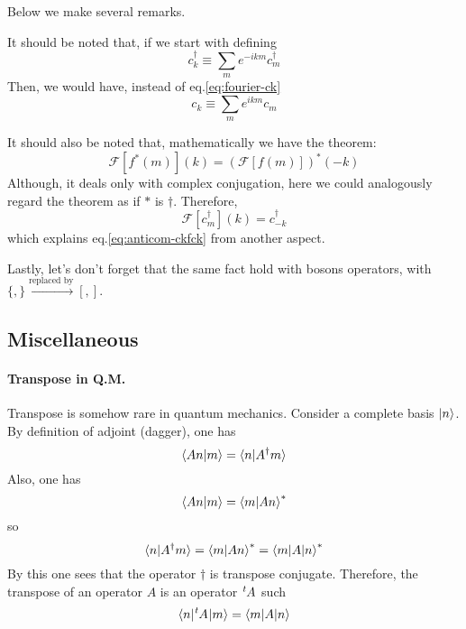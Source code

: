 Below we make several remarks.
\begin{remark}
    It should be noted that, if we start with defining
    \begin{equation}
        c^\dagger_k \equiv \sum_m e^{-ikm} c^\dagger_m
    \end{equation}
    Then, we would have, instead of eq.\ref{eq:fourier-ck}
    \begin{equation}
        c_k \equiv \sum_m e^{ikm} c_m
    \end{equation}
\end{remark}

\begin{remark}
    It should also be noted that, mathematically we have the theorem:
    \begin{equation}
        \mathcal{F}[f^*(m)](k) = (\mathcal{F}[f(m)])^*(-k)
    \end{equation}
    Although, it deals only with complex conjugation, here we could analogously
    regard the theorem as if $*$ is $\dagger$. Therefore,
    \begin{equation}
        \mathcal{F}[c^\dagger_m](k) = c^\dagger_{-k}
    \end{equation}
    which explains eq.\ref{eq:anticom-ckfck} from another aspect.
\end{remark}

\begin{remark}
    Lastly, let's don't forget that the same fact hold with bosons operators, with
    $\{,\}\overset{\text{replaced by}}{\to}[,]$.
\end{remark}

\subsection{Miscellaneous}
\label{sec:Miscellaneous}

\paragraph{Transpose in Q.M.}

Transpose is somehow rare in quantum mechanics. Consider a complete
basis $\ket{n}$. By definition of adjoint (dagger), one has
\begin{equation}
    \braket{ An|m }=\braket{n | A^\dagger m}
\end{equation}
Also, one has
\begin{equation}
    \braket{ An|m } = \braket{ m|An }^*
\end{equation}
so
\begin{equation}
    \braket{ n|A^\dagger m } = \braket{ m|An }^* = \braket{ m|A|n }^*
\end{equation}
By this one sees that the operator $\dagger$ is transpose conjugate.
Therefore, the transpose of an operator $A$ is an operator
$\tensor[^t]{A}{}$ such
\begin{equation}
    \braket{ n|\tensor[^t]{A}{}|m } = \braket{ m|A|n }
\end{equation}
